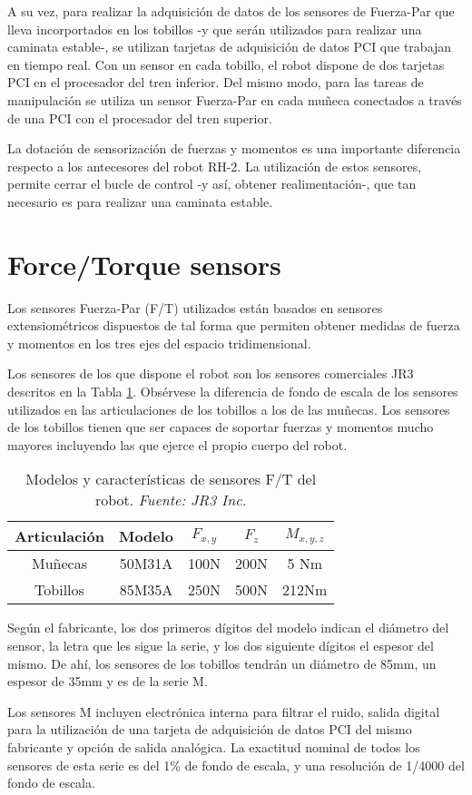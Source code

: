 A su vez, para realizar la adquisición de datos de los sensores de Fuerza-Par que lleva incorportados en los tobillos -y que serán utilizados para realizar una caminata estable-, se utilizan tarjetas de adquisición de datos PCI que trabajan en tiempo real. Con un sensor en cada tobillo, el robot dispone de dos tarjetas PCI en el procesador del tren inferior. Del mismo modo, para las tareas de manipulación se utiliza un sensor Fuerza-Par en cada muñeca conectados a través de una PCI con el procesador del tren superior.

La dotación de sensorización de fuerzas y momentos es una importante diferencia respecto a los antecesores del robot RH-2. La utilización de estos sensores, permite cerrar el bucle de control -y así, obtener realimentación-, que tan necesario es para realizar una caminata estable.


\section{Force/Torque sensors}
Los sensores Fuerza-Par (F/T) utilizados están basados en sensores extensiométricos dispuestos de tal forma que permiten obtener medidas de fuerza y momentos en los tres ejes del espacio tridimensional.

Los sensores de los que dispone el robot son los sensores comerciales JR3 descritos en la Tabla \ref{table:sensores}. Obsérvese la diferencia de fondo de escala de los sensores utilizados en las articulaciones de los tobillos a los de las muñecas. Los sensores de los tobillos tienen que ser capaces de soportar fuerzas y momentos mucho mayores incluyendo las que ejerce el propio cuerpo del robot.

\begin{table}[!hbt]
\centering
\begin{tabular}{|c|c|c|c|c|}
\hline
Articulación & Modelo & $F_{x,y}$ & $F_z$ & $M_{x,y,z}$\\
\hline
Muñecas & 50M31A & 100N & 200N & 5 Nm\\ 
\hline
Tobillos & 85M35A & 250N & 500N & 212Nm\\
\hline
\end{tabular}
\caption{Modelos y características de sensores F/T del robot. \textit{Fuente: JR3 Inc.}}
\label{table:sensores}
\end{table}

Según el fabricante, los dos primeros dígitos del modelo indican el diámetro del sensor, la letra que les sigue la serie, y los dos siguiente dígitos el espesor del mismo. De ahí, los sensores de los tobillos tendrán un diámetro de 85mm, un espesor de 35mm y es de la serie M. 

Los sensores M incluyen electrónica interna para filtrar el ruido, salida digital para la utilización de una tarjeta de adquisición de datos PCI del mismo fabricante y opción de salida analógica. La exactitud nominal de todos los sensores de esta serie es del 1\% de fondo de escala, y una resolución de 1/4000 del fondo de escala.
